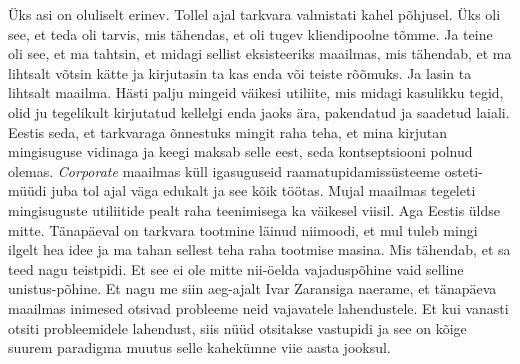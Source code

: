 
Üks asi on oluliselt erinev. Tollel ajal tarkvara valmistati kahel põhjusel. 
Üks oli see, et teda oli tarvis, mis tähendas, et  oli tugev kliendipoolne 
tõmme. Ja teine oli see, et ma tahtsin, et midagi sellist eksisteeriks 
maailmas, mis tähendab, et ma lihtsalt võtsin kätte ja kirjutasin ta kas enda 
või teiste rõõmuks. Ja lasin ta lihtsalt maailma. Hästi palju mingeid väikesi 
utiliite, mis midagi kasulikku tegid, olid ju tegelikult kirjutatud kellelgi 
enda jaoks ära, pakendatud ja saadetud laiali. Eestis seda, et tarkvaraga 
õnnestuks mingit raha teha, et mina kirjutan mingisuguse vidinaga ja keegi 
maksab selle eest, seda kontseptsiooni polnud olemas. \emph{Corporate} maailmas 
küll igasuguseid  raamatupidamissüsteeme osteti-müüdi juba tol ajal väga 
edukalt ja see kõik töötas. Mujal maailmas tegeleti mingisuguste utiliitide 
pealt raha teenimisega ka väikesel viisil. Aga Eestis üldse mitte. Tänapäeval 
on  tarkvara tootmine läinud niimoodi, et mul tuleb mingi 
ilgelt hea idee ja ma tahan sellest teha raha tootmise masina. Mis 
tähendab, et sa teed nagu teistpidi. Et see ei ole mitte nii-öelda 
vajaduspõhine vaid selline unistus-põhine. Et nagu me siin 
aeg-ajalt Ivar Zaransiga naerame, et tänapäeva 
maailmas  inimesed  otsivad probleeme neid vajavatele lahendustele. Et kui 
vanasti otsiti probleemidele lahendust, siis nüüd otsitakse vastupidi ja see on 
 kõige suurem paradigma muutus selle kahekümne viie aasta jooksul.